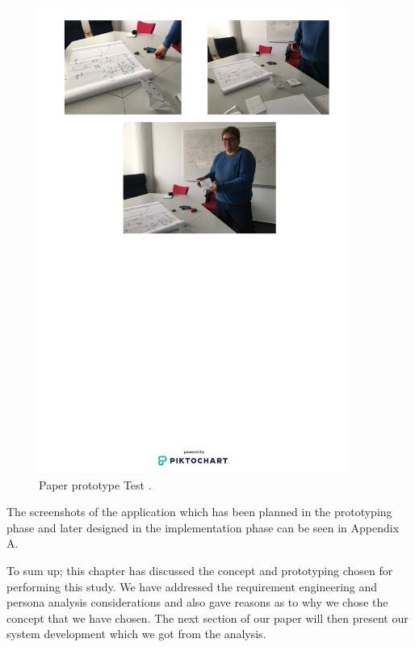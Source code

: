 \begin{figure}[hbt!] 
  \centering
  \includegraphics[width=0.9\textwidth]{chap3/image/poster.png}
  \caption[Paper prototype Test ]{Paper prototype Test .}
  \label{fig:Poster}
\end{figure}

The screenshots of the application which has been planned in the prototyping phase and later designed in the implementation phase can be seen in Appendix A.


To sum up; this chapter has discussed the concept and prototyping chosen for performing this study. We have addressed the requirement engineering and persona analysis considerations and also gave reasons as to why we  chose  the  concept  that  we have  chosen. The next section of our paper will then present our system development which we got from the analysis. 


